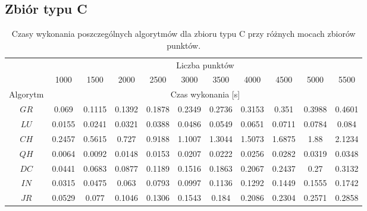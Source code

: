\documentclass[11pt]{article}
\theoremstyle{remark} \newtheorem{definition}{def.}
\theoremstyle{definition} \newtheorem{twierdzenie}{tw.}
\begin{document}
\subsection{Zbiór typu C}

\begin{table}[]
\centering
\caption{Czasy wykonania poszczególnych algorytmów dla zbioru typu C przy różnych mocach zbiorów punktów.}
\label{tab:prost}
\begin{tabular}{c|c|c|c|c|c|c|c|c|c|c|}
\cline{2-11}
\multicolumn{1}{l|}{} & \multicolumn{10}{c|}{Liczba punktów} \\ \cline{2-11} 
\multicolumn{1}{l|}{} & 1000 & 1500 & 2000 & 2500 & 3000 & 3500 & 4000 & 4500 & 5000 & 5500 \\ \hline
\multicolumn{1}{|c|}{Algorytm} & \multicolumn{10}{c|}{Czas wykonania {[}s{]}} \\ \hline
\multicolumn{1}{|c|}{$GR$} & 0.069 & 0.1115 & 0.1392 & 0.1878 & 0.2349 & 0.2736 & 0.3153 & 0.351 & 0.3988 & 0.4601 \\ \hline
\multicolumn{1}{|c|}{$LU$} & 0.0155 & 0.0241 & 0.0321 & 0.0388 & 0.0486 & 0.0549 & 0.0651 & 0.0711 & 0.0784 & 0.084 \\ \hline
\multicolumn{1}{|c|}{$CH$} & 0.2457 & 0.5615 & 0.727 & 0.9188 & 1.1007 & 1.3044 & 1.5073 & 1.6875 & 1.88 & 2.1234 \\ \hline
\multicolumn{1}{|c|}{$QH$} & 0.0064 & 0.0092 & 0.0148 & 0.0153 & 0.0207 & 0.0222 & 0.0256 & 0.0282 & 0.0319 & 0.0348 \\ \hline
\multicolumn{1}{|c|}{$DC$} & 0.0441 & 0.0683 & 0.0877 & 0.1189 & 0.1516 & 0.1863 & 0.2067 & 0.2437 & 0.27 & 0.3132 \\ \hline
\multicolumn{1}{|c|}{$IN$} & 0.0315 & 0.0475 & 0.063 & 0.0793 & 0.0997 & 0.1136 & 0.1292 & 0.1449 & 0.1555 & 0.1742 \\ \hline
\multicolumn{1}{|c|}{$JR$} & 0.0529 & 0.077 & 0.1046 & 0.1306 & 0.1543 & 0.184 & 0.2086 & 0.2304 & 0.2571 & 0.2858 \\ \hline
\end{tabular}
\end{table}
\end{document}
